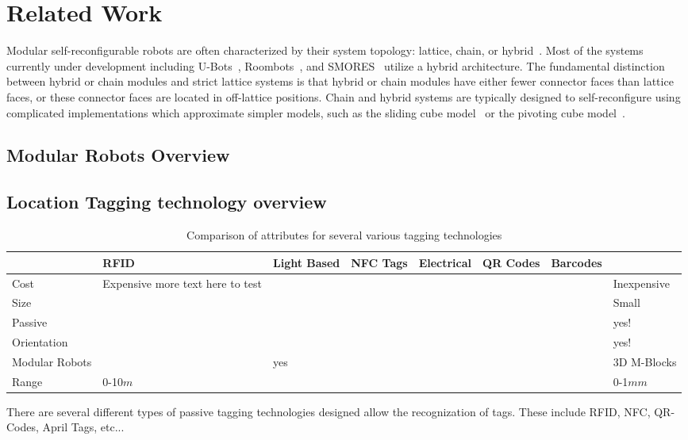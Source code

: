 \section{Related Work}
\label{sec:RelatedWork}

Modular self-reconfigurable robots are often characterized by their
system topology: lattice, chain, or hybrid~\cite{Yim-RAM07}.  Most of
the systems currently under development including U-Bots~\cite{ubot},
Roombots~\cite{roombots3}, and SMORES~\cite{Yim-RAM07} utilize a hybrid
architecture. The fundamental distinction between hybrid or chain modules and
strict lattice systems is that hybrid or chain modules have either fewer
connector faces than lattice faces, or these connector faces are
located in off-lattice positions.  Chain and hybrid
systems are typically designed to self-reconfigure using complicated
implementations which approximate simpler models, such as the sliding cube model~\cite{FitchRus-IROS03} or
the pivoting cube model~\cite{RomanishinRus-IROS13}.

\subsection{Modular Robots Overview}

\subsection{Location Tagging technology overview}

\begin{table*}[ht]
	\centering
	\caption{Comparison of attributes for several various tagging technologies}
	\newcommand{\wdd}{1.8cm}
	\begin{tabular}{ p{\wdd} |p{\wdd}  p{\wdd} p{\wdd} p{\wdd} p{\wdd} p{\wdd} p{\wdd}  }
		\hline
		& RFID 				%
		& Light Based		%
		& NFC Tags 			%
		& Electrical 		%
		& QR Codes 			%
		& Barcodes			%
		& \tagNamePlural \\ %
		\hline
		Cost			& Expensive more text here to test	& 			& 		& 		& 		& 	  	& Inexpensive \\
		Size 			&  			& 			&    	&   	&       &     	& Small		  \\
		Passive 		&  			&			&  		&	 	&		& 		& yes!		  \\
		Orientation 	&  			& 			&  		&	 	&	  	& 		& yes!		\\
		Modular Robots 	&  			& yes		&	  	&		&		& 		& 3D M-Blocks\\
		Range			& 0-10$m$	&			&		&		&		&		& 0-1$mm$	\\
	\end{tabular}
	\label{tab:tagTech}    
\end{table*}

There are several different types of passive tagging technologies designed allow the recognization of tags. These include RFID, NFC, QR-Codes, April Tags, etc... 


